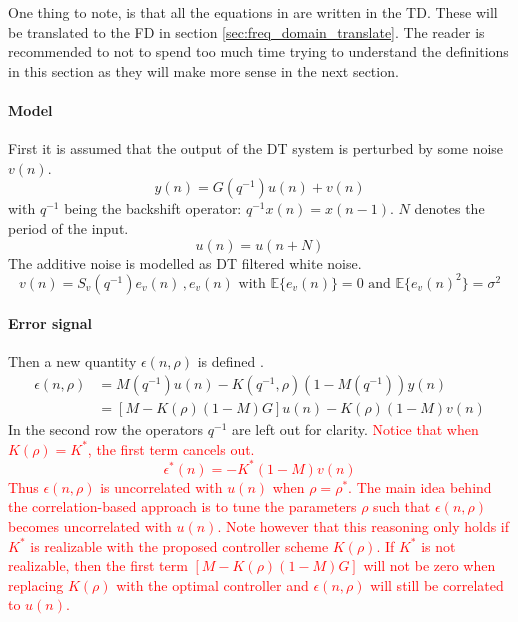 One thing to note, is that all the equations in \cite{Data-driven_model_reference_control} are written in the TD. These will be translated to the FD in section \ref{sec:freq_domain_translate}. The reader is recommended to not to spend too much time trying to understand the definitions in this section as they will make more sense in the next section.

\paragraph{Model}
First it is assumed that the output of the DT system is perturbed by some noise $v(n)$.
\begin{equation}
    y(n) = G(q^{-1}) u(n) + v(n)
    \label{eq:model_TD}
\end{equation}
with $q^{-1}$ being the backshift operator: $q^{-1} x(n) = x(n-1)$. $N$ denotes the period of the input.
\begin{equation}
    u(n) = u(n+N)
    \label{eq:periodicity_u}
\end{equation}
The additive noise is modelled as DT filtered white noise.
\begin{equation*}
    v(n) = S_v(q^{-1}) e_v(n) \,, e_v(n) \text{ with } \mathbb{E}\{e_v(n)\} = 0 \text{ and } \mathbb{E}\{e_v(n)^2\} = \sigma^2
\end{equation*}

\paragraph{Error signal}
Then a new quantity $\epsilon(n,\rho)$ is defined \cite[eq. (15)]{Data-driven_model_reference_control}.
\begin{align*}
    \epsilon(n,\rho) &= M(q^{-1}) u(n) - K(q^{-1},\rho) (1-M(q^{-1})) y(n) \\
    &= [M-K(\rho) (1-M) G ] u(n) - K(\rho) (1-M) v(n)
\end{align*}
In the second row the operators $q^{-1}$ are left out for clarity. \textcolor{red}{Notice that when $K(\rho) = K^*$, the first term cancels out.
\begin{equation*}
	\epsilon^*(n) = -K^*(1-M)v(n)
\end{equation*}
Thus $\epsilon(n,\rho)$ is uncorrelated with $u(n)$ when $\rho = \rho^*$. The main idea behind the correlation-based approach is to tune the parameters $\rho$ such that $\epsilon(n,\rho)$ becomes uncorrelated with $u(n)$. Note however that this reasoning only holds if $K^*$ is realizable with the proposed controller scheme $K(\rho)$. If $K^*$ is not realizable, then the first term $[M-K(\rho) (1-M) G ]$ will not be zero when replacing $K(\rho)$ with the optimal controller and $\epsilon(n,\rho)$ will still be correlated to $u(n)$.
}

